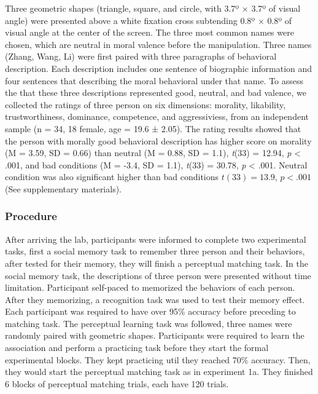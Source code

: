 \documentclass[
  english,
  man]{apa6}
\begin{document}
Three geometric shapes (triangle, square, and circle, with 3.7º × 3.7º of visual angle) were presented above a white fixation cross subtending 0.8º × 0.8º of visual angle at the center of the screen. The three most common names were chosen, which are neutral in moral valence before the manipulation.
Three names (Zhang, Wang, Li) were first paired with three paragraphs of behavioral description. Each description includes one sentence of biographic information and four sentences that describing the moral behavioral under that name. To assess the that these three descriptions represented good, neutral, and bad valence, we collected the ratings of three person on six dimensions: morality, likability, trustworthiness, dominance, competence, and aggressiviess, from an independent sample (n = 34, 18 female, age = 19.6 ± 2.05). The rating results showed that the person with morally good behavioral description has higher score on morality (M = 3.59, SD = 0.66) than neutral (M = 0.88, SD = 1.1), \emph{t}(33) = 12.94, \emph{p} \textless{} .001, and bad conditions (M = -3.4, SD = 1.1), \emph{t}(33) = 30.78, \emph{p} \textless{} .001. Neutral condition was also significant higher than bad conditions \(t(33) = 13.9\), \(p < .001\) (See supplementary materials).

\hypertarget{procedure-2}{%
\subsubsection{Procedure}\label{procedure-2}}

After arriving the lab, participants were informed to complete two experimental tasks, first a social memory task to remember three person and their behaviors, after tested for their memory, they will finish a perceptual matching task.
In the social memory task, the descriptions of three person were presented without time limitation. Participant self-paced to memorized the behaviors of each person. After they memorizing, a recognition task was used to test their memory effect. Each participant was required to have over 95\% accuracy before preceding to matching task.
The perceptual learning task was followed, three names were randomly paired with geometric shapes. Participants were required to learn the association and perform a practicing task before they start the formal experimental blocks. They kept practicing util they reached 70\% accuracy. Then, they would start the perceptual matching task as in experiment 1a. They finished 6 blocks of perceptual matching trials, each have 120 trials.
\end{document}
